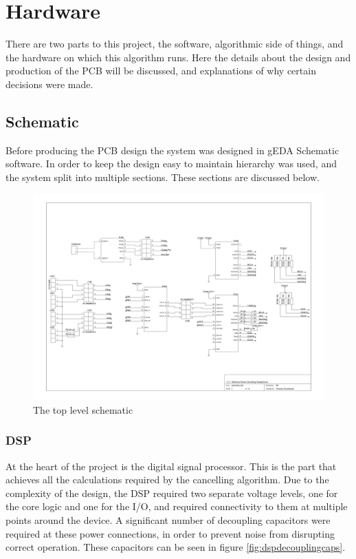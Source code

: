 \section{Hardware}

There are two parts to this project, the software, algorithmic side of things, and the hardware on which this algorithm runs.
Here the details about the design and production of the PCB will be discussed, and explanations of why certain decisions were made.

\subsection{Schematic}
\label{sec:imple:hard:sch}
Before producing the PCB design the system was designed in gEDA Schematic software.
In order to keep the design easy to maintain hierarchy was used, and the system split into multiple sections.
These sections are discussed below.

\begin{figure}[H]
	\centering
	\includegraphics[width=\textwidth]{./img/overview.png}
	\caption{The top level schematic}
	\label{fig:overviewsch}
\end{figure}

\subsubsection{DSP}
At the heart of the project is the digital signal processor.
This is the part that achieves all the calculations required by the cancelling algorithm.
Due to the complexity of the design, the DSP required two separate voltage levels, one for the core logic and one for the I/O, and required connectivity to them at multiple points around the device.
A significant number of decoupling capacitors were required at these power connections, in order to prevent noise from disrupting correct operation.
These capacitors can be seen in figure \ref{fig:dspdecouplingcaps}.

